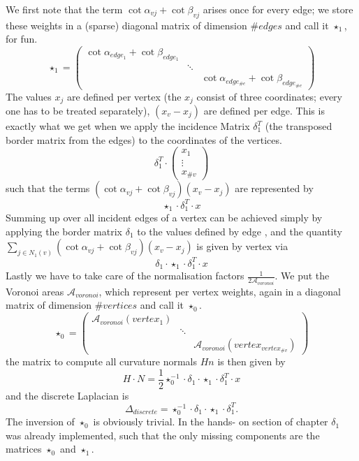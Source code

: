 We first note that the term $\cot \alpha_{vj} + \cot \beta_{vj}$ arises once for every edge; we store these weights in a (sparse) diagonal matrix of dimension $\# edges$ and call it $\star_1$, for fun.
\[\star_1 = \begin{pmatrix}
\cot \alpha_{edge_1} + \cot \beta_{edge_1} & & \\
& \ddots & \\
& & \cot \alpha_{edge_{\#e}} + \cot \beta_{edge_{\#e}}
\end{pmatrix}\]
The values $x_j$ are defined per vertex (the $x_j$ consist of three coordinates; every one has to be treated separately), $(x_v-x_j)$ are defined per edge. This is exactly what we get when we apply the incidence Matrix $\delta_1^T$ (the transposed border matrix from the edges) to the coordinates of the vertices.
\[\delta_1^T \cdot \begin{pmatrix}
x_1 \\
\vdots\\
x_{\#v}
\end{pmatrix}\]
such that the terms $(\cot \alpha_{vj} + \cot \beta_{vj})(x_v-x_j)$ are represented by 
\[\star_1\cdot \delta_1^T \cdot x\]
Summing up over all incident edges  of a vertex can be achieved simply by applying the border matrix $\delta_1$ to the values defined by edge , and the quantity $\sum_{j\in N_1(v)} (\cot \alpha_{vj} + \cot \beta_{vj})(x_v-x_j)$ is given by vertex via
\[\delta_1\cdot\star_1\cdot \delta_1^T \cdot x\]
Lastly we have to take care of the normalisation factors $\frac{1}{2 \mathcal A_{voronoi}}$. We put the Voronoi areas $\mathcal A_{voronoi}$, which represent per vertex weights, again in a diagonal matrix of dimension $\# vertices$ and call it $\star_0$.
\[\star_0 =\begin{pmatrix}
\mathcal A_{voronoi}(vertex_1) & & \\
& \ddots & \\
& & \mathcal A_{voronoi}(vertex_{vertex_{\#v}})
\end{pmatrix}\] 
the matrix to compute all curvature normals $Hn$ is then given by
\[H\cdot N = \frac{1}{2} \star_0^{-1}\cdot\delta_1\cdot\star_1\cdot \delta_1^T \cdot x \]
and the discrete Laplacian is
\[\Delta_{discrete} = \star_0^{-1}\cdot\delta_1\cdot\star_1\cdot \delta_1^T.\]
The inversion of $\star_0$ is obviously trivial. In the hands- on section of chapter \note{ } $\delta_1$ was already implemented, such that the only missing components are the matrices $\star_0$ and $\star_1$.


